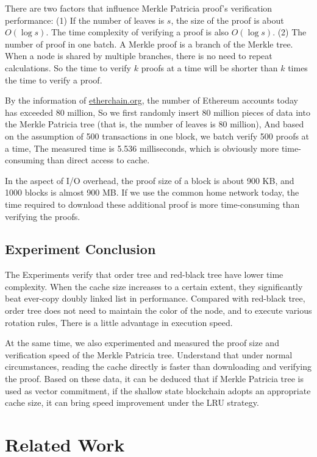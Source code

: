 \documentclass[conference]{IEEEtran}
\begin{document}
There are two factors that influence
Merkle Patricia proof's verification performance:
(1) If the number of leaves is $s$,
the size of the proof is about $O(\log s)$.
The time complexity of verifying a proof is also $O(\log s)$.
(2) The number of proof in one batch.
A Merkle proof is a branch of the Merkle tree.
When a node is shared by multiple branches,
there is no need to repeat calculations.
So the time to verify $k$ proofs at a time will be
shorter than $k$ times the time to verify a proof.

By the information of \href{https://www.etherchain.org/charts/totalAccounts}{etherchain.org},
the number of Ethereum accounts today has exceeded 80 million,
So we first randomly insert 80 million pieces
of data into the Merkle Patricia
tree (that is, the number of leaves is 80 million),
And based on the assumption of 500 transactions in
one block, we batch verify 500 proofs at a time,
The measured time is 5.536 milliseconds, which is
obviously more time-consuming than direct access to cache.

In the aspect of I/O overhead, the proof size of a
block is about 900 KB, and 1000 blocks is almost 900 MB.
If we use the common home network today,
the time required to download these additional
proof is more time-consuming than verifying the proofs.

\subsection{Experiment Conclusion}

The Experiments verify that order tree and red-black tree
have lower time complexity. When the cache size increases
to a certain extent, they significantly beat ever-copy
doubly linked list in performance. Compared with
red-black tree, order tree does not need to maintain
the color of the node, and to execute various rotation rules,
There is a little advantage in execution speed.

At the same time, we also experimented and measured
the proof size and verification speed of the Merkle
Patricia tree. Understand that under normal circumstances,
reading the cache directly is faster than downloading
and verifying the proof. Based on these data,
it can be deduced that if Merkle Patricia tree
is used as vector commitment, if the shallow state
blockchain adopts an appropriate cache size, it
can bring speed improvement under the LRU strategy.

\section{Related Work}
\end{document}
